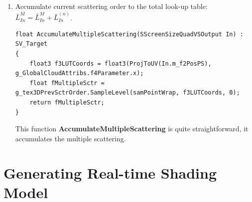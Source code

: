 \begin{enumerate}
\item Accumulate current scattering order to the total look-up table: $\bar{L}_{In}^M = \bar{L}_{In}^M + \bar{L}_{In}^{(n)}$.
\begin{lstlisting}
float AccumulateMultipleScattering(SScreenSizeQuadVSOutput In) : SV_Target
{
    float3 f3LUTCoords = float3(ProjToUV(In.m_f2PosPS), g_GlobalCloudAttribs.f4Parameter.x);
    float fMultipleSctr = g_tex3DPrevSctrOrder.SampleLevel(samPointWrap, f3LUTCoords, 0);
    return fMultipleSctr;
}
\end{lstlisting}

This function \textbf{AccumulateMultipleScattering} is quite straightforward, it accumulates the multiple scattering.
\end{enumerate}

\section{Generating Real-time Shading Model}
